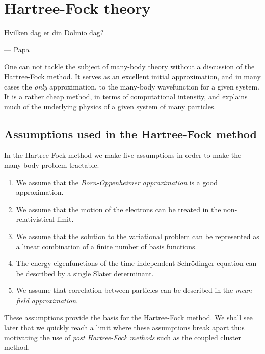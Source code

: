 \chapter{Hartree-Fock theory}
    \epigraph{Hvilken dag er din Dolmio dag?}{--- Papa}

    One can not tackle the subject of many-body theory without a discussion of
    the Hartree-Fock method. It serves as an excellent initial approximation,
    and in many cases the \emph{only} approximation, to the many-body
    wavefunction for a given system. It is a rather cheap method, in terms of
    computational intensity, and explains much of the underlying physics of a
    given system of many particles.

    \section{Assumptions used in the Hartree-Fock method}
        In the Hartree-Fock method we make five assumptions in order to make the
        many-body problem tractable.
        \begin{enumerate}
            \item We assume that the \emph{Born-Oppenheimer approximation} is a
                good approximation.
            \item We assume that the motion of the electrons can be treated in
                the non-relativistical limit.
            \item We assume that the solution to the variational problem can be
                represented as a linear combination of a finite number of basis
                functions.
            \item The energy eigenfunctions of the time-independent Schrödinger
                equation can be described by a single Slater determinant.
            \item We assume that correlation between particles can be described
                in the \emph{mean-field approximation}.
        \end{enumerate}
        These assumptions provide the basis for the Hartree-Fock method. We
        shall see later that we quickly reach a limit where these assumptions
        break apart thus motivating the use of \emph{post Hartree-Fock methods}
        such as the coupled cluster method.

